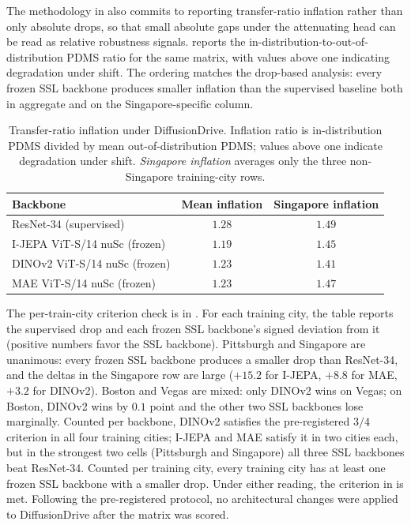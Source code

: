 The methodology in  also commits to reporting transfer-ratio inflation rather than only absolute drops, so that small absolute gaps under the attenuating head can be read as relative robustness signals.  reports the in-distribution-to-out-of-distribution PDMS ratio for the same matrix, with values above one indicating degradation under shift. The ordering matches the drop-based analysis: every frozen SSL backbone produces smaller inflation than the supervised baseline both in aggregate and on the Singapore-specific column.

\begin{table}[ht]
\centering
\caption[DiffusionDrive transfer-ratio inflation.]{Transfer-ratio inflation under DiffusionDrive. Inflation ratio is in-distribution PDMS divided by mean out-of-distribution PDMS; values above one indicate degradation under shift. \emph{Singapore inflation} averages only the three non-Singapore training-city rows.}
\label{tab:dd-cc-ratios}
\small
\renewcommand{\arraystretch}{1.15}
\setlength{\tabcolsep}{6pt}
\begin{tabular}{@{}>{\raggedright\arraybackslash}p{5.0cm} c c@{}}
\toprule
\textbf{Backbone} & \textbf{Mean inflation} & \textbf{Singapore inflation} \\
\midrule
ResNet-34 (supervised)        & $1.28$           & $1.49$ \\
\midrule
I-JEPA ViT-S/14 nuSc (frozen) & $\mathbf{1.19}$  & $1.45$ \\
DINOv2 ViT-S/14 nuSc (frozen) & $1.23$           & $\mathbf{1.41}$ \\
MAE ViT-S/14 nuSc (frozen)    & $1.23$           & $1.47$ \\
\bottomrule
\end{tabular}
\end{table}

The per-train-city criterion check is in . For each training city, the table reports the supervised drop and each frozen SSL backbone's signed deviation from it (positive numbers favor the SSL backbone). Pittsburgh and Singapore are unanimous: every frozen SSL backbone produces a smaller drop than ResNet-34, and the deltas in the Singapore row are large ($+15.2$ for I-JEPA, $+8.8$ for MAE, $+3.2$ for DINOv2). Boston and Vegas are mixed: only DINOv2 wins on Vegas; on Boston, DINOv2 wins by $0.1$ point and the other two SSL backbones lose marginally. Counted per backbone, DINOv2 satisfies the pre-registered $3/4$ criterion in all four training cities; I-JEPA and MAE satisfy it in two cities each, but in the strongest two cells (Pittsburgh and Singapore) all three SSL backbones beat ResNet-34. Counted per training city, every training city has at least one frozen SSL backbone with a smaller drop. Under either reading, the criterion in  is met. Following the pre-registered protocol, no architectural changes were applied to DiffusionDrive after the matrix was scored.

